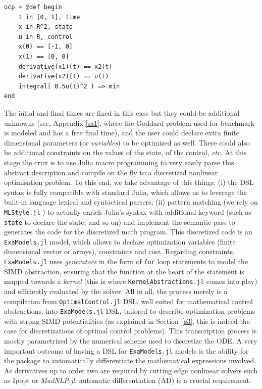 \begin{verbatim}
ocp = @def begin
    t in [0, 1], time
    x in R^2, state
    u in R, control
    x(0) == [-1, 0]
    x(1) == [0, 0]
    derivative(x1)(t) == x2(t)
    derivative(x2)(t) == u(t)
    integral( 0.5u(t)^2 ) => min
end
\end{verbatim}

The intial and final times are fixed in this case but they could be additional unknowns (see, Appendix \ref{sa1}, where the Goddard problem used for benchmark is modeled and has a free final time), and the user could declare extra finite dimensional parameters (or \emph{variables}) to be optimized as well. There could also be additional constraints on the values of the state, of the control, \emph{etc.}
At this stage the crux is to use Julia macro programming to very easily parse this 
abstract description and compile on the fly to a discretized nonlinear optimisation problem. To this end, we take advantage of this things: (i) the DSL syntax is fully compatible with standard Julia, which allows us to leverage the built-in language lexical and syntactical parsers; (ii) pattern matching (we rely on \texttt{MLStyle.jl} \cite{xxxx}) to actually enrich Julia's syntax with additional keyword (such as \verb+state+ to declare the state, and so on) and implement the semantic pass to generates the code for the discretized math program.
This discretized code is an \texttt{ExaModels.jl} model, which allows to declare 
optimization variables (finite dimensional vector or arrays), constraints and cost.
Regarding constraints, \texttt{ExaModels.jl} uses \emph{generators} in the form of \verb+for+ loop statements to model the SIMD abstraction, ensuring that the function
at the heart of the statement is mapped towards a \emph{kernel} (this is where \texttt{KernelAbstractions.jl} comes into play) and efficiently evaluated by the solver. All in all, the process merely is a compilation from \texttt{OptimalControl.jl} DSL, well suited for mathematical control abstractions, into \texttt{ExaModels.jl} DSL, tailored to describe optimization problems with strong SIMD potentialities (as explained in Section~\ref{s3}, this is indeed the case for discretizations of optimal control problems). 
This transcription process is mostly parametrized by the numerical scheme used to discretize the ODE.
%
A very important outcome of having a DSL for \texttt{ExaModels.jl} models is the ability for the package to automatically differentiate the mathematical expressions involved. As derivatives up to order two are required by cutting edge nonlinear solvers such as Ipopt or \emph{MadNLP.jl}, automatic differentiation (AD) is a crucial requirement.

